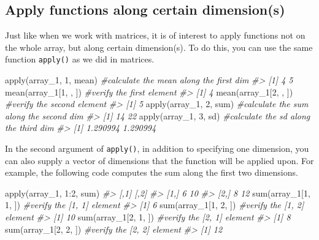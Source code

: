 \documentclass[
]{book}
\newenvironment{Shaded}{\begin{snugshade}}{\end{snugshade}}
\newcommand{\CommentTok}[1]{\textcolor[rgb]{0.56,0.35,0.01}{\textit{#1}}}
\newcommand{\DecValTok}[1]{\textcolor[rgb]{0.00,0.00,0.81}{#1}}
\newcommand{\FunctionTok}[1]{\textcolor[rgb]{0.00,0.00,0.00}{#1}}
\newcommand{\NormalTok}[1]{#1}
\newcommand{\SpecialCharTok}[1]{\textcolor[rgb]{0.00,0.00,0.00}{#1}}
\begin{document}
\hypertarget{apply-functions-along-certain-dimensions}{%
\subsection{Apply functions along certain dimension(s)}\label{apply-functions-along-certain-dimensions}}

Just like when we work with matrices, it is of interest to apply functions not on the whole array, but along certain dimension(s). To do this, you can use the same function \texttt{apply()} as we did in matrices.

\begin{Shaded}
\begin{Highlighting}[]
\FunctionTok{apply}\NormalTok{(array\_1, }\DecValTok{1}\NormalTok{, mean)      }\CommentTok{\#calculate the mean along the first dim}
\CommentTok{\#\textgreater{} [1] 4 5}
\FunctionTok{mean}\NormalTok{(array\_1[}\DecValTok{1}\NormalTok{, , ])         }\CommentTok{\#verify the first element}
\CommentTok{\#\textgreater{} [1] 4}
\FunctionTok{mean}\NormalTok{(array\_1[}\DecValTok{2}\NormalTok{, , ])         }\CommentTok{\#verify the second element}
\CommentTok{\#\textgreater{} [1] 5}
\FunctionTok{apply}\NormalTok{(array\_1, }\DecValTok{2}\NormalTok{, sum)       }\CommentTok{\#calculate the sum along the second dim}
\CommentTok{\#\textgreater{} [1] 14 22}
\FunctionTok{apply}\NormalTok{(array\_1, }\DecValTok{3}\NormalTok{, sd)        }\CommentTok{\#calculate the sd along the third dim}
\CommentTok{\#\textgreater{} [1] 1.290994 1.290994}
\end{Highlighting}
\end{Shaded}

In the second argument of \texttt{apply()}, in addition to specifying one dimension, you can also supply a vector of dimensions that the function will be applied upon. For example, the following code computes the sum along the first two dimensions.

\begin{Shaded}
\begin{Highlighting}[]
\FunctionTok{apply}\NormalTok{(array\_1, }\DecValTok{1}\SpecialCharTok{:}\DecValTok{2}\NormalTok{, sum) }
\CommentTok{\#\textgreater{}      [,1] [,2]}
\CommentTok{\#\textgreater{} [1,]    6   10}
\CommentTok{\#\textgreater{} [2,]    8   12}
\FunctionTok{sum}\NormalTok{(array\_1[}\DecValTok{1}\NormalTok{, }\DecValTok{1}\NormalTok{, ])      }\CommentTok{\#verify the [1, 1] element}
\CommentTok{\#\textgreater{} [1] 6}
\FunctionTok{sum}\NormalTok{(array\_1[}\DecValTok{1}\NormalTok{, }\DecValTok{2}\NormalTok{, ])      }\CommentTok{\#verify the [1, 2] element}
\CommentTok{\#\textgreater{} [1] 10}
\FunctionTok{sum}\NormalTok{(array\_1[}\DecValTok{2}\NormalTok{, }\DecValTok{1}\NormalTok{, ])      }\CommentTok{\#verify the [2, 1] element}
\CommentTok{\#\textgreater{} [1] 8}
\FunctionTok{sum}\NormalTok{(array\_1[}\DecValTok{2}\NormalTok{, }\DecValTok{2}\NormalTok{, ])      }\CommentTok{\#verify the [2, 2] element}
\CommentTok{\#\textgreater{} [1] 12}
\end{Highlighting}
\end{Shaded}
\end{document}
